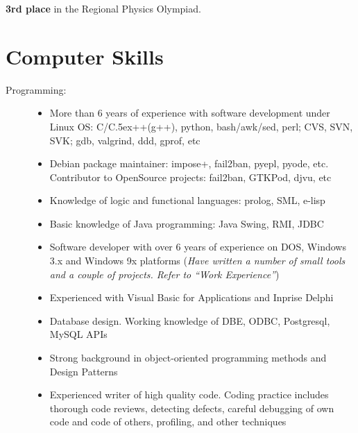 \documentclass[10pt,overlapped,line]{res}
\def\Cplusplus{{\rm C\raise.5ex\hbox{\small ++}}}
\newcommand{\mplace}[1]{\textbf{#1}}
\newcommand{\wdescription}[1]{({\small \textit{#1}})}
\begin{document}
\begin{resume}
 \begin{position}
   \mplace{3rd place} in the Regional Physics Olympiad.

 \end{position}

 \section{Computer Skills}
  \begin{description}
    \item[Programming:]\hspace*{\fill}
      \begin{itemize}
      \item More than 6 years of experience with software development
        under Linux OS: C/\Cplusplus(g++), python, bash/awk/sed, perl;
        CVS, SVN, SVK; gdb, valgrind, ddd, gprof, etc

      \item Debian package maintainer: impose+, fail2ban, pyepl,
        pyode, etc. Contributor to {O}pen{S}ource projects:
        fail2ban, GTKPod, djvu, etc

      \item Knowledge of logic and functional languages: prolog, SML, e-lisp

      \item Basic knowledge of Java programming: Java Swing, RMI,
        JDBC

      \item Software developer with over 6 years of experience on DOS,
        Windows 3.x and Windows 9x platforms
        \wdescription{Have written a number of small tools and a couple of
          projects. Refer to ``Work Experience''}

      \item Experienced with Visual Basic for Applications and Inprise
        Delphi

      \item Database design. Working knowledge of DBE, ODBC,
        Postgresql, MySQL APIs

      \item Strong background in object-oriented programming methods
        and Design Patterns

      \item Experienced writer of high quality code. Coding practice
        includes thorough code reviews, detecting defects, careful
        debugging of own code and code of others, profiling, and other
        techniques
      \end{itemize}


\end{description}
\end{resume}
\end{document}
